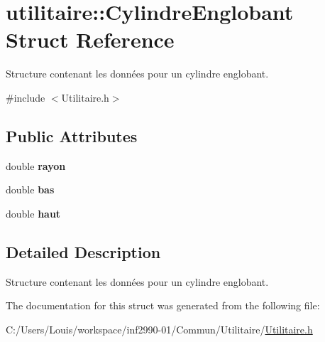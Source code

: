 \hypertarget{structutilitaire_1_1_cylindre_englobant}{}\section{utilitaire\+:\+:Cylindre\+Englobant Struct Reference}
\label{structutilitaire_1_1_cylindre_englobant}


Structure contenant les données pour un cylindre englobant.  




{\ttfamily \#include $<$Utilitaire.\+h$>$}

\subsection*{Public Attributes}
\begin{DoxyCompactItemize}
\item 
\hypertarget{structutilitaire_1_1_cylindre_englobant_abbec6b7a8f2790f286317ffcdeab476c}{}double {\bfseries rayon}\label{structutilitaire_1_1_cylindre_englobant_abbec6b7a8f2790f286317ffcdeab476c}

\item 
\hypertarget{structutilitaire_1_1_cylindre_englobant_ac99c3cebbc6829ad9f54e392f4525e7e}{}double {\bfseries bas}\label{structutilitaire_1_1_cylindre_englobant_ac99c3cebbc6829ad9f54e392f4525e7e}

\item 
\hypertarget{structutilitaire_1_1_cylindre_englobant_a9f86204ad37c5b04fb329b710304c459}{}double {\bfseries haut}\label{structutilitaire_1_1_cylindre_englobant_a9f86204ad37c5b04fb329b710304c459}

\end{DoxyCompactItemize}


\subsection{Detailed Description}
Structure contenant les données pour un cylindre englobant. 

The documentation for this struct was generated from the following file\+:\begin{DoxyCompactItemize}
\item 
C\+:/\+Users/\+Louis/workspace/inf2990-\/01/\+Commun/\+Utilitaire/\hyperlink{_utilitaire_8h}{Utilitaire.\+h}\end{DoxyCompactItemize}
